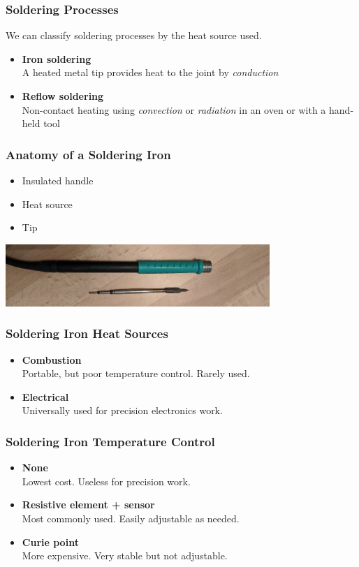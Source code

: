 \documentclass{beamer}
\begin{document}
\begin{frame}
\frametitle{Soldering Processes}
We can classify soldering processes by the heat source used.
\begin{itemize}
\item \textbf{Iron soldering} \\
A heated metal tip provides heat to the joint by \emph{conduction}
\item \textbf{Reflow soldering} \\
Non-contact heating using \emph{convection} or \emph{radiation} in an oven or with a hand-held tool
\end{itemize}
\end{frame}

\begin{frame}
\frametitle{Anatomy of a Soldering Iron}
\begin{itemize}
\item Insulated handle
\item Heat source
\item Tip
\end{itemize}
\begin{center}
\includegraphics[width=10cm,keepaspectratio]{anatomy.jpg}
\end{center}
\end{frame}

\begin{frame}
\frametitle{Soldering Iron Heat Sources}
\begin{itemize}
\item \textbf{Combustion} \\
Portable, but poor temperature control. Rarely used.
\item \textbf{Electrical} \\
Universally used for precision electronics work.
\end{itemize}
\end{frame}

\begin{frame}
\frametitle{Soldering Iron Temperature Control}
\begin{itemize}
\item \textbf{None} \\
Lowest cost. Useless for precision work.
\item \textbf{Resistive element + sensor} \\
Most commonly used. Easily adjustable as needed.
\item \textbf{Curie point} \\
More expensive. Very stable but not adjustable.
\end{itemize}
\end{frame}
\end{document}
